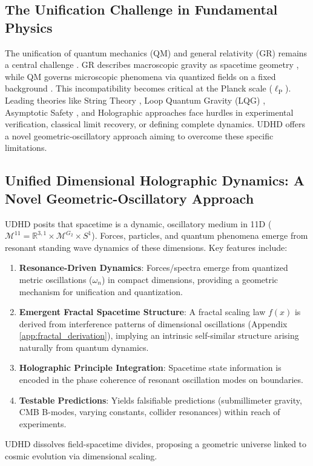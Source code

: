 \documentclass[12pt, a4paper]{article} %
\newcommand{\lplanck}{\ell_{\text{P}}}
\newcommand{\mGtwo}{\mathcal{M}^{G_2}}
\begin{document}
\subsection{The Unification Challenge in Fundamental Physics}
The unification of quantum mechanics (QM) and general relativity (GR) remains a central challenge \cite{kiefer2007quantum}. GR describes macroscopic gravity as spacetime geometry \cite{einstein1915feldgleichungen}, while QM governs microscopic phenomena via quantized fields on a fixed background \cite{dirac1930principles}. This incompatibility becomes critical at the Planck scale (\(\lplanck\)). Leading theories like String Theory \cite{polchinski1998string, smolin2006trouble}, Loop Quantum Gravity (LQG) \cite{rovelli2004quantum, thiemann2007modern}, Asymptotic Safety \cite{reuter2019asymptotic, litim2011asymptotic}, and Holographic approaches \cite{maldacena1999large} face hurdles in experimental verification, classical limit recovery, or defining complete dynamics. UDHD offers a novel geometric-oscillatory approach aiming to overcome these specific limitations.

\subsection{Unified Dimensional Holographic Dynamics: A Novel Geometric-Oscillatory Approach}
UDHD posits that spacetime is a dynamic, oscillatory medium in 11D (\( \mathcal{M}^{11} = \mathbb{R}^{3,1} \times \mGtwo \times S^1 \)). Forces, particles, and quantum phenomena emerge from resonant standing wave dynamics of these dimensions. Key features include:
\begin{enumerate}
    \item \textbf{Resonance-Driven Dynamics}: Forces/spectra emerge from quantized metric oscillations (\(\omega_n\)) in compact dimensions, providing a geometric mechanism for unification and quantization.
    \item \textbf{Emergent Fractal Spacetime Structure}: A fractal scaling law \(f(x)\) is derived from interference patterns of dimensional oscillations (Appendix \ref{app:fractal_derivation}), implying an intrinsic self-similar structure arising naturally from quantum dynamics.
    \item \textbf{Holographic Principle Integration}: Spacetime state information is encoded in the phase coherence of resonant oscillation modes on boundaries.
    \item \textbf{Testable Predictions}: Yields falsifiable predictions (submillimeter gravity, CMB B-modes, varying constants, collider resonances) within reach of experiments.
\end{enumerate}
UDHD dissolves field-spacetime divides, proposing a geometric universe linked to cosmic evolution via dimensional scaling.
\end{document}
